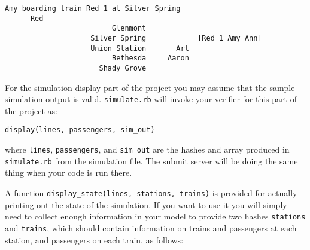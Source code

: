\documentclass[11pt]{article}
\begin{document}
      \begin{Verbatim}[gobble=6,xleftmargin=40mm]
      Amy boarding train Red 1 at Silver Spring
      Red
                         Glenmont
                    Silver Spring            [Red 1 Amy Ann]
                    Union Station       Art
                         Bethesda     Aaron
                      Shady Grove
      \end{Verbatim}

      \vspace{-2mm}

      For the simulation display part of the project you may assume that the
    sample simulation output is valid.  \texttt{simulate.rb} will invoke
    your verifier for this part of the project as:

      \vspace{-2mm}

      \begin{center}

        \texttt{display(lines, passengers, sim\_out)}

      \end{center}

      \vspace{-1.5mm}

    \noindent
    where \texttt{lines}, \texttt{passengers}, and \texttt{sim\_out} are the
    hashes and array produced in \texttt{simulate.rb} from the simulation
    file.  The submit server will be doing the same thing when your code is
    run there.

      A function \texttt{display\_state(lines, stations, trains)} is provided
    for actually printing out the state of the simulation.  If you want to
    use it you will simply need to collect enough information in your model
    to provide two hashes \texttt{stations} and \texttt{trains}, which
    should contain information on trains and passengers at each station, and
    passengers on each train, as follows:

      \vspace{-2.5mm}
\end{document}

